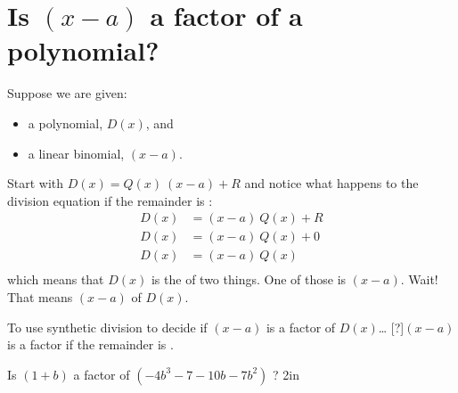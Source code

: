 \section{Is $(x-a)$ a factor of a polynomial?}

Suppose we are given:
\begin{itemize}
    \item a polynomial, $D(x)$, and 
    \item a linear binomial, $(x-a)$.
\end{itemize}

Start with
$ 
D(x) = Q(x)\:(x-a)  +  R
$
and notice what happens to the division equation if the remainder is :
\begin{align*}
    D(x) &= (x-a)\:Q(x)  +  R \\
    D(x) &= (x-a)\:Q(x)  +  0 \\
    D(x) &= (x-a)\:Q(x)   \\
\end{align*}
%
which means that $D(x)$ is the  of two things.
One of those is $(x-a)$.
Wait! That means $(x-a)$  of $D(x)$.

\begin{myConceptSteps}{To use synthetic division to decide if $(x-a)$ is a factor of $D(x)$\dots}
    [?]{$(x-a)$ is a factor if the remainder is . }
\end{myConceptSteps}

{
    Is 
    $(1+b)$ 
    a factor of 
    $(-4b^3 - 7 - 10b - 7b^2)$
    ?
}
{2in}

